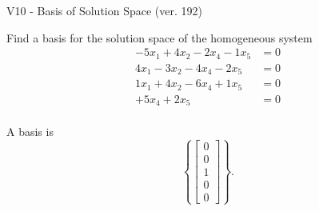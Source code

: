 \begin{exercise}
  \begin{exerciseTitle}V10 - Basis of Solution Space (ver. 192)\end{exerciseTitle}
  \begin{exerciseStatement}
    Find a basis for the solution space of the homogeneous system 
\begin{align*}
 -5 x_ 1 + 4 x_ 2 -2 x_ 4 -1 x_ 5 &= 0  \\ 
  4 x_ 1 -3 x_ 2 -4 x_ 4 -2 x_ 5 &= 0  \\ 
  1 x_ 1 + 4 x_ 2 -6 x_ 4 + 1 x_ 5 &= 0  \\ 
  + 5 x_ 4 + 2 x_ 5 &= 0  \\ 
 \end{align*}


 
  \end{exerciseStatement}

  \begin{exerciseAnswer}
   A basis is   
\[\left\{\left[\begin{array}{c}
0 \\
0 \\
1 \\
0 \\
0
\end{array}\right]\right\}.\]

  


  \end{exerciseAnswer}
\end{exercise}